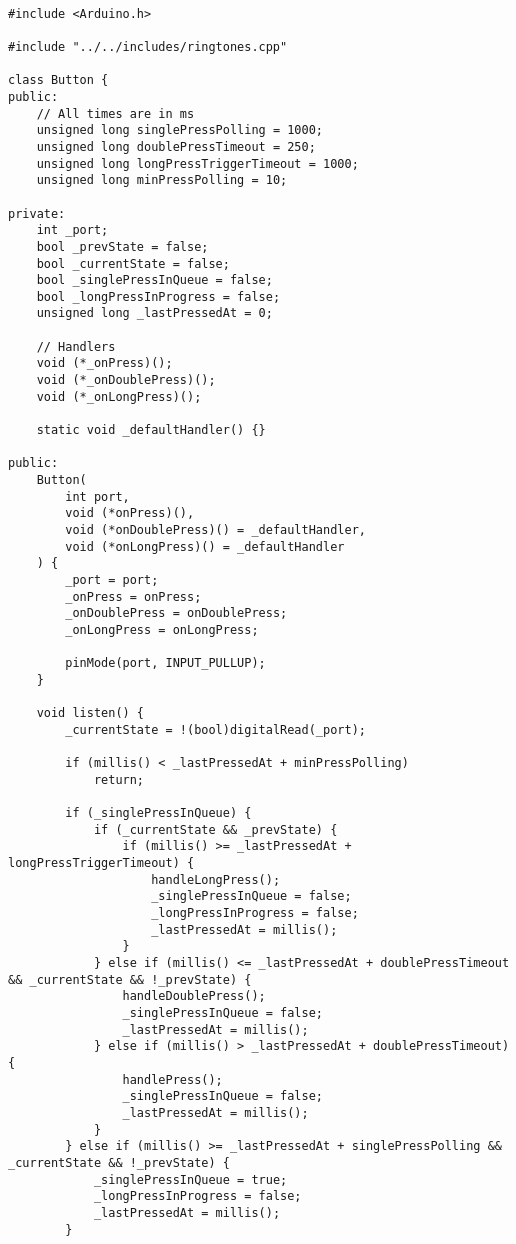 \begin{code}
\begin{verbatim}

#include <Arduino.h>

#include "../../includes/ringtones.cpp"

class Button {
public:
    // All times are in ms
    unsigned long singlePressPolling = 1000;
    unsigned long doublePressTimeout = 250;
    unsigned long longPressTriggerTimeout = 1000;
    unsigned long minPressPolling = 10;

private:
    int _port;
    bool _prevState = false;
    bool _currentState = false;
    bool _singlePressInQueue = false;
    bool _longPressInProgress = false;
    unsigned long _lastPressedAt = 0;

    // Handlers
    void (*_onPress)();
    void (*_onDoublePress)();
    void (*_onLongPress)();

    static void _defaultHandler() {}

public:
    Button(
        int port,
        void (*onPress)(),
        void (*onDoublePress)() = _defaultHandler,
        void (*onLongPress)() = _defaultHandler
    ) {
        _port = port;
        _onPress = onPress;
        _onDoublePress = onDoublePress;
        _onLongPress = onLongPress;

        pinMode(port, INPUT_PULLUP);
    }

    void listen() {
        _currentState = !(bool)digitalRead(_port);

        if (millis() < _lastPressedAt + minPressPolling)
            return;

        if (_singlePressInQueue) {
            if (_currentState && _prevState) {
                if (millis() >= _lastPressedAt + longPressTriggerTimeout) {
                    handleLongPress();
                    _singlePressInQueue = false;
                    _longPressInProgress = false;
                    _lastPressedAt = millis();
                }
            } else if (millis() <= _lastPressedAt + doublePressTimeout && _currentState && !_prevState) {
                handleDoublePress();
                _singlePressInQueue = false;
                _lastPressedAt = millis();
            } else if (millis() > _lastPressedAt + doublePressTimeout) {
                handlePress();
                _singlePressInQueue = false;
                _lastPressedAt = millis();
            }
        } else if (millis() >= _lastPressedAt + singlePressPolling && _currentState && !_prevState) {
            _singlePressInQueue = true;
            _longPressInProgress = false;
            _lastPressedAt = millis();
        }


\end{verbatim}
\end{code}
